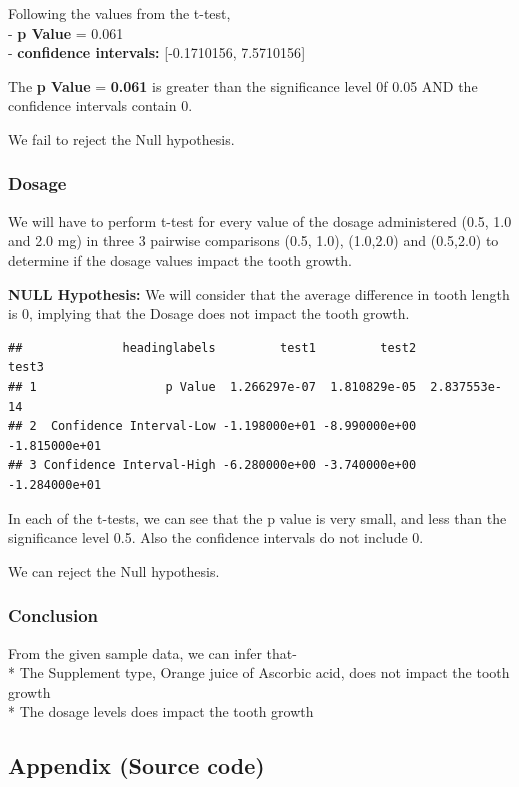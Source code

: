 \documentclass[]{article}
\begin{document}
Following the values from the t-test,\\
- \textbf{p Value} = 0.061\\
- \textbf{confidence intervals:} {[}-0.1710156, 7.5710156{]}

The \textbf{p Value} = \textbf{0.061} is greater than the significance
level 0f 0.05 AND the confidence intervals contain 0.

We fail to reject the Null hypothesis.

\subsubsection{Dosage}\label{dosage}

We will have to perform t-test for every value of the dosage
administered (0.5, 1.0 and 2.0 mg) in three 3 pairwise comparisons (0.5,
1.0), (1.0,2.0) and (0.5,2.0) to determine if the dosage values impact
the tooth growth.

\textbf{NULL Hypothesis:} We will consider that the average difference
in tooth length is 0, implying that the Dosage does not impact the tooth
growth.

\begin{verbatim}
##              headinglabels         test1         test2         test3
## 1                  p Value  1.266297e-07  1.810829e-05  2.837553e-14
## 2  Confidence Interval-Low -1.198000e+01 -8.990000e+00 -1.815000e+01
## 3 Confidence Interval-High -6.280000e+00 -3.740000e+00 -1.284000e+01
\end{verbatim}

In each of the t-tests, we can see that the p value is very small, and
less than the significance level 0.5. Also the confidence intervals do
not include 0.

We can reject the Null hypothesis.

\subsubsection{Conclusion}\label{conclusion}

From the given sample data, we can infer that-\\
* The Supplement type, Orange juice of Ascorbic acid, does not impact
the tooth growth\\
* The dosage levels does impact the tooth growth

\subsection{Appendix (Source code)}\label{appendix-source-code}
\end{document}
